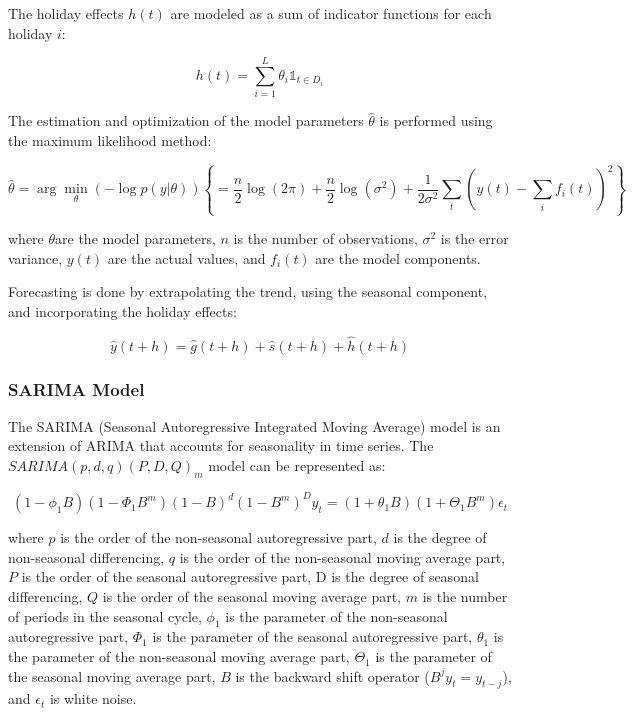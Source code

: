 The holiday effects $h(t)$ are modeled as a sum of indicator functions for each holiday $i$:



\begin{equation}
h(t) = \sum_{i=1}^L \theta_i \mathbb{1}_{t \in D_i}
\end{equation}

The estimation and optimization of the model parameters $\hat{\theta}$ is performed using the maximum likelihood method:

\begin{equation}
\hat{\theta} = \arg\min_{\theta} (-\log p(y | \theta) ) \left\{ = \frac{n}{2}\log(2\pi) + \frac{n}{2}\log(\sigma^2) + \frac{1}{2\sigma^2}\sum_{t} \left(y(t) - \sum_{i} f_i(t)\right)^2 \right\}
\end{equation}

where  $\theta$are the model parameters, $n$  is the number of observations, $\sigma^2$ is the error variance, $y(t)$ are the actual values, and $f_i(t)$ are the model components.

Forecasting is done by extrapolating the trend, using the seasonal component, and incorporating the holiday effects:


\begin{equation}
\hat{y}(t+h) = \hat{g}(t+h) + \hat{s}(t+h) + \hat{h}(t+h)
\end{equation}

\subsubsection{SARIMA Model}

The SARIMA (Seasonal Autoregressive Integrated Moving Average) model is an extension of ARIMA that accounts for seasonality in time series. The $SARIMA(p,d,q)(P,D,Q)_m$ model can be represented as:

\begin{equation}
(1-\phi_1 B) (1-\Phi_1 B^m)(1-B)^d(1-B^m)^D y_t = (1+\theta_1 B) (1+\Theta_1 B^m)\epsilon_t
\end{equation}

where $p$ is the order of the non-seasonal autoregressive part, $d$ is the degree of non-seasonal differencing, $q$ is the order of the non-seasonal moving average part, $P$ is the order of the seasonal autoregressive part, D is the degree of seasonal differencing, $Q$ is the order of the seasonal moving average part, $m$ is the number of periods in the seasonal cycle, $\phi_1$ is the parameter of the non-seasonal autoregressive part, $\Phi_1$ is the parameter of the seasonal autoregressive part, $\theta_1$ is the parameter of the non-seasonal moving average part, $\Theta_1$ is the parameter of the seasonal moving average part, $B$ is the backward shift operator ($B^j y_t = y_{t-j}$), and $\epsilon_t$ is white noise.

